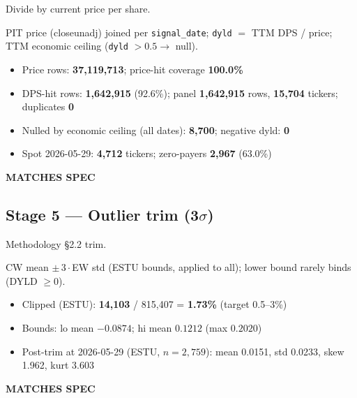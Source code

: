 \documentclass[11pt,a4paper]{article}
\newcommand{\PASS}[1]{\textcolor{pass}{\textbf{#1}}}
\begin{document}
\begin{description}[style=nextline]
  \item[PDF SPEC] Divide by current price per share.
  \item[Implementation] PIT price (closeunadj) joined per \texttt{signal\_date}; \texttt{dyld} $=$ TTM DPS / price; TTM economic ceiling (\texttt{dyld} $>0.5 \to$ null).
  \item[Observed]\phantom{x}
    \begin{itemize}[nosep, topsep=-\parskip]
      \item Price rows: \textbf{37{,}119{,}713}; price-hit coverage \textbf{100.0\%}
      \item DPS-hit rows: \textbf{1{,}642{,}915} (92.6\%); panel \textbf{1{,}642{,}915} rows, \textbf{15{,}704} tickers; duplicates \textbf{0}
      \item Nulled by economic ceiling (all dates): \textbf{8{,}700}; negative dyld: \textbf{0}
      \item Spot 2026-05-29: \textbf{4{,}712} tickers; zero-payers \textbf{2{,}967} (63.0\%)
    \end{itemize}
  \item[Status] \PASS{MATCHES SPEC}
\end{description}

\subsection{Stage 5 --- Outlier trim (3$\sigma$)}

\begin{description}[style=nextline]
  \item[PDF SPEC] Methodology \S2.2 trim.
  \item[Implementation] CW mean $\pm\,3\cdot$EW std (ESTU bounds, applied to all); lower bound rarely binds (DYLD $\geq 0$).
  \item[Observed]\phantom{x}
    \begin{itemize}[nosep, topsep=-\parskip]
      \item Clipped (ESTU): \textbf{14{,}103} / 815{,}407 = \textbf{1.73\%} (target 0.5--3\%)
      \item Bounds: lo mean $-0.0874$; hi mean $0.1212$ (max $0.2020$)
      \item Post-trim at 2026-05-29 (ESTU, $n=2{,}759$): mean 0.0151, std 0.0233, skew 1.962, kurt 3.603
    \end{itemize}
  \item[Status] \PASS{MATCHES SPEC}
\end{description}
\end{document}
